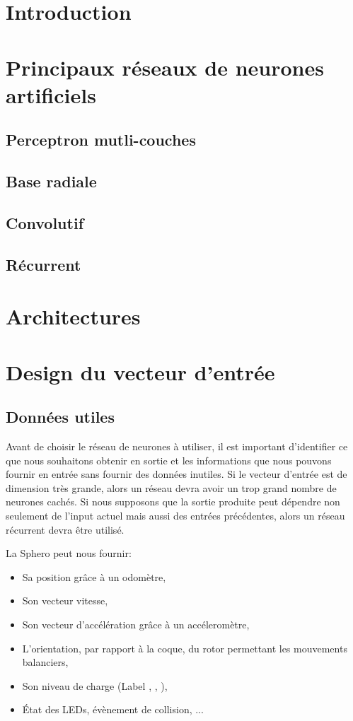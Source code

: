 \documentclass[12pt,a4paper,oneside, titlepage]{article}
\begin{document}


\section{Introduction}
\terminologie
\section{Principaux réseaux de neurones artificiels}
\subsection{Perceptron mutli-couches}
\subsection{Base radiale}
\subsection{Convolutif}
\subsection{Récurrent}
\section{Architectures}
\section{Design du vecteur d'entrée}
\subsection{Données utiles}
Avant de choisir le réseau de neurones à utiliser, il est important d'identifier ce que nous souhaitons obtenir en sortie et les informations que nous pouvons fournir en entrée sans fournir des données inutiles.
Si le vecteur d'entrée est de dimension très grande, alors un réseau \rbf devra avoir un trop grand nombre de neurones cachés\cite{Gauthier}.
Si nous supposons que la sortie produite peut dépendre non seulement de l'input actuel mais aussi des entrées précédentes, alors un réseau récurrent devra être utilisé.

La Sphero peut nous fournir:
\begin{itemize}%
 \item Sa position grâce à un odomètre,
 \item Son vecteur vitesse,
 \item Son vecteur d'accélération grâce à un accéleromètre,
 \item L'orientation, par rapport à la coque, du rotor permettant les mouvements balanciers,
 \item Son niveau de charge (Label , , ),%
 \item État des LEDs, évènement de collision, ... %
\end{itemize}
\end{document}

